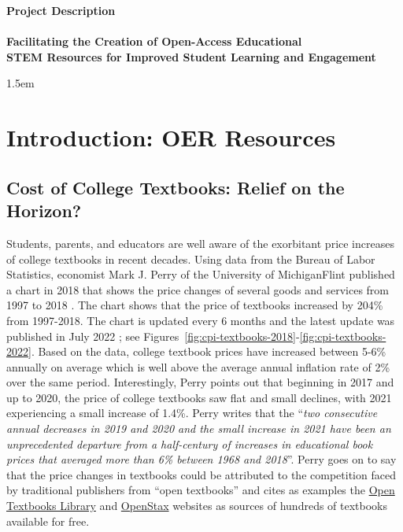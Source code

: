 \documentclass[11pt]{article}
\theoremstyle{theorem}
\theoremstyle{definition}
\begin{document}
\begin{center}
\textbf{\Large Project Description}\\[0.25cm]
\hrulefill\\[0.5cm]
\textbf{\Large Facilitating the Creation of Open-Access Educational \\[0.25cm] STEM Resources for Improved Student Learning and Engagement}\\
\hrulefill
\end{center}
\baselineskip 1.5em

\section{Introduction: OER Resources}


\subsection{Cost of College Textbooks: Relief on the Horizon?}
Students, parents, and educators are well aware of the exorbitant price increases of college textbooks in recent decades.  Using data from the Bureau of Labor Statistics, economist Mark J. Perry of the University of Michigan\textendash Flint published a chart in 2018 that shows the price changes of several goods and services from 1997 to 2018 \cite{perry2018}.  The chart shows that the price of textbooks increased by 204\% from 1997-2018.  The chart is updated every 6 months and the latest update was published in July 2022 \cite{perry2022}; see Figures~\ref{fig:cpi-textbooks-2018}-\ref{fig:cpi-textbooks-2022}.  Based on the data, college textbook prices have increased between 5-6\% annually on average which is well above the average annual inflation rate of 2\% over the same period.  Interestingly, Perry points out that beginning in 2017 and up to 2020, the price of college textbooks saw flat and small declines, with 2021 experiencing a small increase of 1.4\%.  Perry writes that the ``\textit{two consecutive annual decreases in 2019 and 2020 and the small increase in 2021 have been an unprecedented departure from a half-century of increases in educational book prices that averaged more than 6\% between 1968 and 2018}''.  Perry goes on to say that the price changes in textbooks could be attributed to the competition faced by traditional publishers from ``open textbooks'' and cites as examples the \href{https://open.umn.edu/opentextbooks}{Open Textbooks Library} and \href{https://openstax.org/}{OpenStax} websites as sources of hundreds of textbooks available for free.
\end{document}

